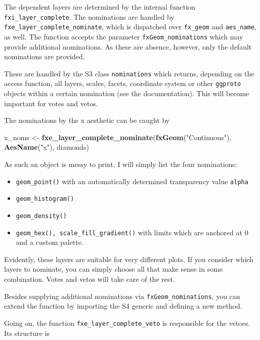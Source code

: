 \documentclass[]{report}
\newenvironment{Shaded}{\begin{snugshade}}{\end{snugshade}}
\newcommand{\KeywordTok}[1]{\textcolor[rgb]{0.13,0.29,0.53}{\textbf{#1}}}
\newcommand{\StringTok}[1]{\textcolor[rgb]{0.31,0.60,0.02}{#1}}
\newcommand{\NormalTok}[1]{#1}
\providecommand{\tightlist}{%
  \setlength{\itemsep}{0pt}\setlength{\parskip}{0pt}}
\theoremstyle{definition}
\theoremstyle{definition}
\theoremstyle{definition}
\theoremstyle{remark}
\begin{document}
The dependent layers are determined by the internal function
\texttt{fxi\_layer\_complete}. The nominations are handled by
\texttt{fxe\_layer\_complete\_nominate}, which is dispatched over
\texttt{fx\_geom} and \texttt{aes\_name}, as well. The function accepts
the parameter \texttt{fxGeom\_nominations} which may provide additional
nominations. As these are absence, however, only the default nominations
are provided.

These are handled by the S3 class \texttt{nominations} which returns,
depending on the access function, all layers, scales, facets, coordinate
system or other \texttt{ggproto} objects within a certain nomination
(see the documentation). This will become important for votes and vetos.

The nominations by the x aesthetic can be caught by

\begin{Shaded}
\begin{Highlighting}[]
\NormalTok{x_noms <-}\StringTok{ }\KeywordTok{fxe_layer_complete_nominate}\NormalTok{(}\KeywordTok{fxGeom}\NormalTok{(}\StringTok{"Continuous"}\NormalTok{), }\KeywordTok{AesName}\NormalTok{(}\StringTok{"x"}\NormalTok{), diamonds)}
\end{Highlighting}
\end{Shaded}

As such an object is messy to print, I will simply list the four
nominations:

\begin{itemize}
\tightlist
\item
  \texttt{geom\_point()} with an automatically determined transparency
  value \texttt{alpha}
\item
  \texttt{geom\_histogram()}
\item
  \texttt{geom\_density()}
\item
  \texttt{geom\_hex(),\ scale\_fill\_gradient()} with limits which are
  anchored at 0 and a custom palette.
\end{itemize}

Evidently, these layers are suitable for very different plots. If you
consider which layers to nominate, you can simply choose all that make
sense in some combination. Votes and vetos will take care of the rest.

Besides supplying additional nominations via
\texttt{fxGeom\_nominations}, you can extend the function by importing
the S4 generic and defining a new method.

Going on, the function \texttt{fxe\_layer\_complete\_veto} is
responsible for the vetoes. Its structure is
\end{document}

